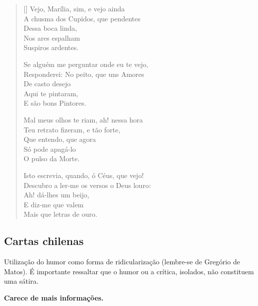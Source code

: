 \documentclass[12pt]{book}
\begin{document}
\begin{enumerate}
\begin{verse}[\versewidth]
						Vejo, Marília, sim, e vejo ainda \\
						A chusma dos Cupidos, que pendentes \\
						\hspace{2em} Dessa boca linda, \\
						\hspace{2em} Nos ares espalham \\
						\hspace{2em} Suspiros ardentes.
						
						Se alguém me perguntar onde eu te vejo, \\
						Responderei: No peito, que uns Amores \\
						\hspace{2em} De casto desejo \\
						\hspace{2em} Aqui te pintaram, \\
						\hspace{2em} E são bons Pintores.
						
						Mal meus olhos te riam, ah! nessa hora \\
						Teu retrato fizeram, e tão forte, \\
						\hspace{2em} Que entendo, que agora \\
						\hspace{2em} Só pode apagá-lo \\
						\hspace{2em} O pulso da Morte.
						
						Isto escrevia, quando, ó Céus, que vejo! \\
						Descubro a ler-me os versos o Deus louro: \\
						\hspace{2em} Ah! dá-lhes um beijo, \\
						\hspace{2em} E diz-me que valem \\
						\hspace{2em} Mais que letras de ouro.
					\end{verse}
				\end{enumerate}
				\subsection{Cartas chilenas}
				\par Utilização do humor como forma de ridicularização (lembre-se de Gregório de Matos). É importante ressaltar que o humor ou a crítica, isolados, não constituem uma sátira.
				\par \textbf{Carece de mais informações.}
\end{document}
